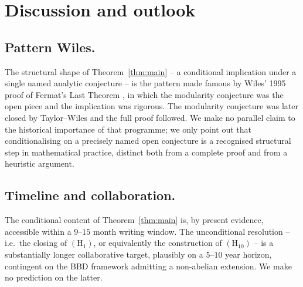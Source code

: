 \documentclass[11pt,reqno]{amsart}
\theoremstyle{plain}
\theoremstyle{definition}
\theoremstyle{remark}
\begin{document}
\section{Discussion and outlook}
\label{sec:discussion}

\subsection{Pattern Wiles.}
The structural shape of Theorem~\ref{thm:main} -- a conditional implication under a single named analytic conjecture -- is the pattern made famous by Wiles' 1995 proof of Fermat's Last Theorem \cite{Wiles1995}, in which the modularity conjecture was the open piece and the implication was rigorous. The modularity conjecture was later closed by Taylor--Wiles \cite{TaylorWiles1995} and the full proof followed. We make no parallel claim to the historical importance of that programme; we only point out that conditionalising on a precisely named open conjecture is a recognised structural step in mathematical practice, distinct both from a complete proof and from a heuristic argument.

\subsection{Timeline and collaboration.}
The conditional content of Theorem~\ref{thm:main} is, by present evidence, accessible within a $9$--$15$ month writing window. The unconditional resolution -- i.e.\ the closing of $(\mathrm{H}_1)$, or equivalently the construction of $(\mathrm{H}_{10})$ -- is a substantially longer collaborative target, plausibly on a $5$--$10$ year horizon, contingent on the BBD framework admitting a non-abelian extension. We make no prediction on the latter.
\end{document}
